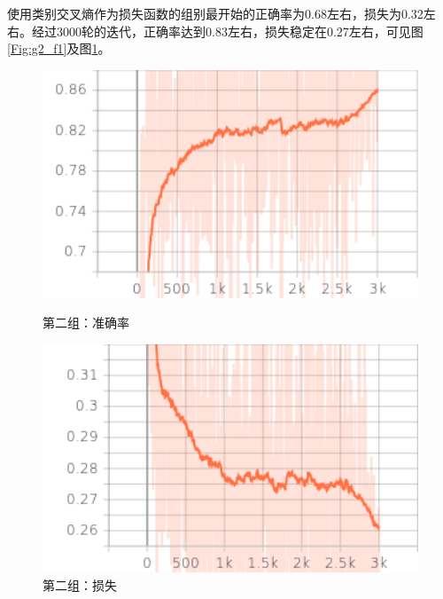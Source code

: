 使用类别交叉熵作为损失函数的组别最开始的正确率为0.68左右，损失为0.32左右。经过3000轮的迭代，正确率达到0.83左右，损失稳定在0.27左右，可见图\ref{Fig:g2_f1}及图\ref{Fig:g2_f2}。

\begin{figure}[htbp]
    
    \centering
    \begin{minipage}[t]{0.49\textwidth}
        \centering
        \includegraphics[width=1\textwidth]{Figures/图表/类别平衡交叉熵/accuracy.png}
        \caption{第二组：准确率}
        \label{Fig:g2_f1}
    \end{minipage}
    \begin{minipage}[t]{0.49\textwidth}
        \centering
        \includegraphics[width=1\textwidth]{Figures/图表/类别平衡交叉熵/cost.png}
        \caption{第二组：损失}
        \label{Fig:g2_f2}
    \end{minipage}
    
\end{figure}

